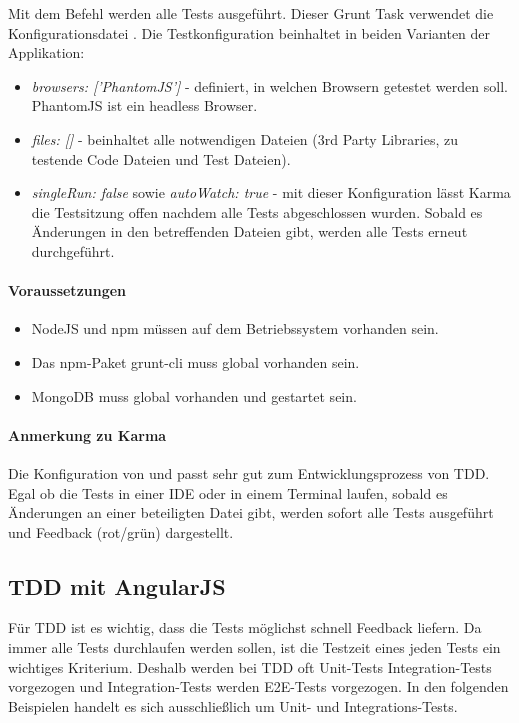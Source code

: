 Mit dem Befehl  werden alle Tests ausgeführt. Dieser Grunt Task verwendet die Konfigurationsdatei .
Die Testkonfiguration beinhaltet in beiden Varianten der Applikation:
\begin{itemize}
  \item \textit{browsers: ['PhantomJS']} - definiert, in welchen Browsern getestet werden soll. PhantomJS ist ein headless Browser.
  \item \textit{files: []} - beinhaltet alle notwendigen Dateien (3rd Party Libraries, zu testende Code Dateien und Test Dateien).
  \item \textit{singleRun: false} sowie \textit{autoWatch: true} - mit dieser Konfiguration lässt Karma die Testsitzung offen nachdem alle Tests abgeschlossen wurden. Sobald es Änderungen in den betreffenden Dateien gibt, werden alle Tests erneut durchgeführt.
\end{itemize}

\paragraph{Voraussetzungen}
\begin{itemize}
 \item NodeJS und npm müssen auf dem Betriebssystem vorhanden sein.
 \item Das npm-Paket grunt-cli muss global vorhanden sein.
 \item MongoDB muss global vorhanden und gestartet sein.
\end{itemize}

\paragraph{Anmerkung zu Karma}
Die Konfiguration von  und  passt sehr gut zum Entwicklungsprozess von TDD. Egal ob die Tests in einer IDE oder in einem Terminal laufen, sobald es Änderungen an einer beteiligten Datei gibt, werden sofort alle Tests ausgeführt und Feedback (rot/grün) dargestellt.

\newpage
\subsection{TDD mit AngularJS}
Für TDD ist es wichtig, dass die Tests möglichst schnell Feedback liefern. Da immer alle Tests durchlaufen werden sollen, ist die Testzeit eines jeden Tests ein wichtiges Kriterium. Deshalb werden bei TDD oft Unit-Tests Integration-Tests vorgezogen und Integration-Tests werden E2E-Tests vorgezogen. In den folgenden Beispielen handelt es sich ausschließlich um Unit- und Integrations-Tests.

